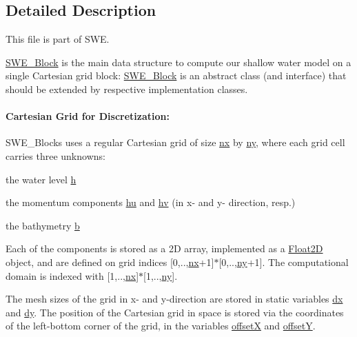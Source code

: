 \subsection{Detailed Description}
This file is part of S\+WE. 

\hyperlink{classSWE__Block}{S\+W\+E\+\_\+\+Block} is the main data structure to compute our shallow water model on a single Cartesian grid block\+: \hyperlink{classSWE__Block}{S\+W\+E\+\_\+\+Block} is an abstract class (and interface) that should be extended by respective implementation classes.

\paragraph*{Cartesian Grid for Discretization\+:}

S\+W\+E\+\_\+\+Blocks uses a regular Cartesian grid of size \hyperlink{classSWE__Block_a46ec0dc1157997bd255fb39924f1e2bb}{nx} by \hyperlink{classSWE__Block_a3f139630d12423eb4bd7df3e45c7f5da}{ny}, where each grid cell carries three unknowns\+:
\begin{DoxyItemize}
\item the water level \hyperlink{classSWE__Block_a64a0f8f437f38b5f3b8ec5b4abdb864e}{h}
\item the momentum components \hyperlink{classSWE__Block_aec2c1278fdb23f083216d8d397f26060}{hu} and \hyperlink{classSWE__Block_a0897aa3c2d78749f209c95e08196d831}{hv} (in x-\/ and y-\/ direction, resp.)
\item the bathymetry \hyperlink{classSWE__Block_af7487209129f40b26ea171762754a261}{b}
\end{DoxyItemize}

Each of the components is stored as a 2D array, implemented as a \hyperlink{classFloat2D}{Float2D} object, and are defined on grid indices \mbox{[}0,..,\hyperlink{classSWE__Block_a46ec0dc1157997bd255fb39924f1e2bb}{nx}+1\mbox{]}$\ast$\mbox{[}0,..,\hyperlink{classSWE__Block_a3f139630d12423eb4bd7df3e45c7f5da}{ny}+1\mbox{]}. The computational domain is indexed with \mbox{[}1,..,\hyperlink{classSWE__Block_a46ec0dc1157997bd255fb39924f1e2bb}{nx}\mbox{]}$\ast$\mbox{[}1,..,\hyperlink{classSWE__Block_a3f139630d12423eb4bd7df3e45c7f5da}{ny}\mbox{]}.

The mesh sizes of the grid in x-\/ and y-\/direction are stored in static variables \hyperlink{classSWE__Block_af2262b1cce6834d939c5a2315dae49b1}{dx} and \hyperlink{classSWE__Block_a9feb988748d792bca0ca0508e43bd87f}{dy}. The position of the Cartesian grid in space is stored via the coordinates of the left-\/bottom corner of the grid, in the variables \hyperlink{classSWE__Block_aa9e9b1fa797c133c4989e4c54f09b542}{offsetX} and \hyperlink{classSWE__Block_aa05241101a66f0f0548eba6dbbaa1bbb}{offsetY}.

